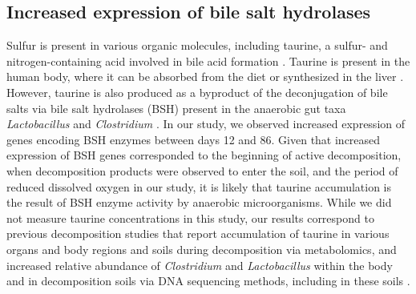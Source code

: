 \documentclass[
  sn-nature,
  lineno, referee]{sn-jnl}
\begin{document}
\subsection{Increased expression of bile salt
hydrolases}\label{increased-expression-of-bile-salt-hydrolases}

Sulfur is present in various organic molecules, including taurine, a
sulfur- and nitrogen-containing acid involved in bile acid formation
\citep{urdaneta_interactions_2017}. Taurine is present in the human
body, where it can be absorbed from the diet or synthesized in the liver
\citep{seidel_taurine_2019}. However, taurine is also produced as a
byproduct of the deconjugation of bile salts via bile salt hydrolases
(BSH) present in the anaerobic gut taxa \emph{Lactobacillus} and
\emph{Clostridium} \citep{urdaneta_interactions_2017}. In our study, we
observed increased expression of genes encoding BSH enzymes between days
12 and 86. Given that increased expression of BSH genes corresponded to
the beginning of active decomposition, when decomposition products were
observed to enter the soil, and the period of reduced dissolved oxygen
in our study, it is likely that taurine accumulation is the result of
BSH enzyme activity by anaerobic microorganisms. While we did not
measure taurine concentrations in this study, our results correspond to
previous decomposition studies that report accumulation of taurine in
various organs and body regions
\citep{mora-ortiz_thanatometabolomics_2019, locci_1h_2019, zelentsova_post-mortem_2016}
and soils
\citep{debruyn_comparative_2021, hoeland_katharina_investigating_2021}
during decomposition via metabolomics, and increased relative abundance
of \emph{Clostridium }and \emph{Lactobacillus} within the body
\citep{javan_human_2016, javan_cadaver_2017, debruyn_postmortem_2017}
and in decomposition soils \citep{cobaugh_functional_2015} via DNA
sequencing methods, including in these soils
\citep{taylor_transient_2024}.
\end{document}
